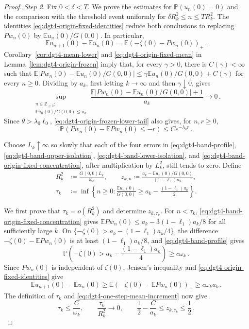 \documentclass[11pt]{amsart}
\theoremstyle{plain}
\theoremstyle{definition}
\newcommand{\Z}{\mathbb{Z}}
\newcommand{\E}{\mathbb{E}}
\renewcommand{\P}{\mathbb{P}}
\begin{document}
\begin{proof}
	\par\smallskip\noindent\emph{Step 2.} Fix $0<\delta<T$. We prove the estimates for
	$\P(u_n(0)=0)$ and the comparison with the threshold event uniformly for
	$\delta R_k^2\leq n\leq TR_k^2$.
	The identities \eqref{eq:dgt4-origin-fixed-identities} reduce both
	conclusions to replacing $Pw_n(0)$ by $\E u_n(0)/G(0,0)$. In particular,
	\[
		\E u_{n+1}(0)-\E u_n(0)=\E(-\zeta(0)-Pw_n(0))_+\, .
	\]
	Corollary~\ref{cor:dgt4-mean-lower} and
	\eqref{eq:dgt4-origin-fixed-mean} in
	Lemma~\ref{lem:dgt4-origin-frozen} imply that, for every $\gamma>0$,
	there is $C(\gamma)<\infty$ such that
	$\E|Pw_n(0)-\E u_n(0)/G(0,0)|
	\leq\gamma\E u_n(0)/G(0,0)+C(\gamma)$ for every $n\geq0$.
	Dividing by $a_k$, first letting $k\to\infty$ and then
	$\gamma\downarrow0$, gives
	\begin{equation}\label{eq:dgt4-band-origin-fixed-concentration}
		\sup_{\substack{n\in\Z_{\geq0}:\\
		\E u_n(0)/G(0,0)\leq a_k}}
		\frac{\E|Pw_n(0)-\E u_n(0)/G(0,0)|+1}{a_k}
		\longrightarrow0\, .
	\end{equation}
	Since $\theta>\lambda_{0}\ell_{0}$,
	\eqref{eq:dgt4-origin-frozen-lower-tail} also gives, for $n,r\geq 0$,
	\begin{equation}\label{eq:dgt4-band-origin-fixed-lower-tail}
		\P(Pw_n(0)-\E Pw_n(0)\leq-r)
		\leq Ce^{-\lambda_{0}r}\, .
	\end{equation}

	Choose $L_k\uparrow\infty$ so slowly that each of the four errors in
	\eqref{eq:dgt4-band-profile},
	\eqref{eq:dgt4-band-upper-isolation},
	\eqref{eq:dgt4-band-lower-isolation}, and
	\eqref{eq:dgt4-band-origin-fixed-concentration}, after multiplication by
	$L_k^2$, still tends to zero. Define
	\[
	\begin{aligned}
		R_k^2&\coloneqq\frac{G(0,0)L_k}{\omega_k}, \qquad
		z_{k,n}\coloneqq
		\frac{a_k-\E u_n(0)/G(0,0)}{(1-\ell_{1})a_k},\\
		\tau_k&\coloneqq
		\inf\left\{
		n\geq0:
		\frac{\E u_n(0)}{G(0,0)}
		\geq a_k-\frac{(1-\ell_{1})a_k}{2}
		\right\}.
	\end{aligned}
	\]

	We first prove that $\tau_k=o(R_k^2)$ and determine
	$z_{k,\tau_k}$.
	For $n<\tau_k$, \eqref{eq:dgt4-band-origin-fixed-concentration} gives
	$\E Pw_n(0)\leq a_k-3(1-\ell_{1})a_k/8$ for all sufficiently large $k$.
	On $\{-\zeta(0)>a_k-(1-\ell_{1})a_k/4\}$, the difference
	$-\zeta(0)-\E Pw_n(0)$ is at least $(1-\ell_{1})a_k/8$, and
	\eqref{eq:dgt4-band-profile} gives
	\[
		\P\left(
		-\zeta(0)>a_k-\frac{(1-\ell_{1})a_k}{4}
		\right)\geq c\omega_k\, .
	\]
	Since $Pw_n(0)$ is independent of $\zeta(0)$, Jensen's inequality and
	\eqref{eq:dgt4-origin-fixed-identities} give
	\[
		\E u_{n+1}(0)-\E u_n(0)
		\geq
		\E(-\zeta(0)-\E Pw_n(0))_+
		\geq c\omega_ka_k\, .
	\]
	The definition of $\tau_k$ and
	\eqref{eq:dgt4-one-step-mean-increment} now give
	\[
		\tau_k\leq\frac{C}{\omega_k},
		\qquad
		\frac{\tau_k}{R_k^2}\longrightarrow0,
		\qquad
		\frac12-\frac{C}{a_k}
		\leq z_{k,\tau_k}\leq\frac12\, .
	\]


\end{proof}
\end{document}
